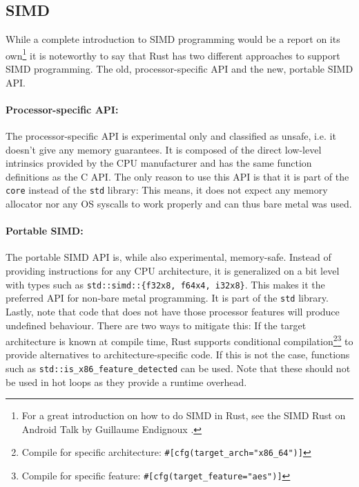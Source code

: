 \subsection{SIMD}
While a complete introduction to \ac{SIMD} programming would be a report on its own\footnote{For a great introduction on how to do \ac{SIMD} in Rust, see the \ac{SIMD} Rust on Android Talk by Guillaume Endignoux \cite{simdtalk}.} it is noteworthy to say that Rust has two different approaches to support \ac{SIMD} programming. The old, processor-specific API and the new, portable SIMD API.

\paragraph{Processor-specific API:} The processor-specific API is experimental only and classified as unsafe, i.e. it doesn't give any memory guarantees. It is composed of the direct low-level intrinsics provided by the CPU manufacturer and has the same function definitions as the C API. The only reason to use this API is that it is part of the \texttt{core} instead of the \texttt{std} library: This means, it does not expect any memory allocator nor any OS syscalls to work properly and can thus bare metal was used.

\paragraph{Portable SIMD:} The portable \ac{SIMD} API is, while also experimental, memory-safe. Instead of providing instructions for any CPU architecture, it is generalized on a bit level with types such as \texttt{std::simd::\{f32x8, f64x4, i32x8\}}. This makes it the preferred API for non-bare metal programming. It is part of the \texttt{std} library.\\

Lastly, note that code that does not have those processor features will produce undefined behaviour. There are two ways to mitigate this: If the target architecture is known at compile time, Rust supports conditional compilation\footnote{Compile for specific architecture: \texttt{\#[cfg(target\_arch="x86\_64")]}}\footnote{Compile for specific feature: \texttt{\#[cfg(target\_feature="aes")]}} to provide alternatives to architecture-specific code. If this is not the case, functions such as \texttt{std::is\_x86\_feature\_detected} can be used. Note that these should not be used in hot loops as they provide a runtime overhead.

